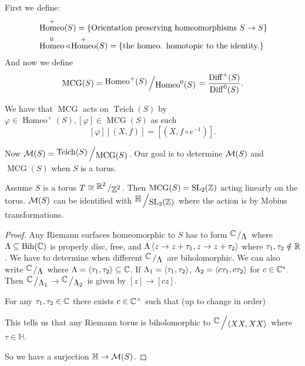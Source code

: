 \documentclass[11pt,a4paper]{article}
\DeclareMathOperator{\Bih}{Bih}
\renewcommand{\H}{\mathbb H}
\DeclareMathOperator{\Homeo}{Homeo}
\DeclareMathOperator{\Diff}{Diff}
\DeclareMathOperator{\MCG}{MCG}
\DeclareMathOperator{\Teich}{Teich}
\begin{document}
\begin{definition}
  First we define:
  \begin{align*}
    &\Homeo^+(S) = \set{\text{Orientation preserving homeomorphisms
    $S \to S$}} \\
    &\Homeo^0 \triangleleft \Homeo^+(S) = \set{
      \text{the homeo. homotopic to the identity.}}
  \end{align*}
  And now we define
  \[
    \MCG(S) = \bigslant{\Homeo^+(S)}{\Homeo^0(S)} =
    \frac{\Diff^+(S)}{\Diff^0(S)}.
  \]
\end{definition}

We have that $\MCG$ acts on $\Teich(S)$ by $\varphi \in \Homeo^+(S),
[\varphi] \in \MCG(S)$
as such
\[
  [\varphi] [(X,f)] = [(X,f \circ e^{-1})].
\]

Now $\M(S) = \bigslant{\Teich(S)}{\MCG(S)}$.
Our goal is to determine $\mathcal{M}(S)$ and $\MCG(S)$ when $S$ is a torus.

\begin{theorem}
  Assume $S$ is a torus $T \cong \bigslant{\R^2}{\Z^2}$.
  Then $\MCG(S) = \SL_2(\Z)$ acting linearly on the torus.
  $\mathcal{M}(S)$ can be identified with $\bigslant{\H}{\SL_2(\Z)}$ where the
  action is by Mobius transformations.
\end{theorem}
\begin{proof}
  Any Riemann surfaces homeomorphic to $S$ has to form 
  $\bigslant{\C}{\Lambda}$ where $\Lambda \subseteq \Bih(\C)$ is
properly disc, free, and $\Lambda \left\langle z \to z + \tau_1, z \to z + \tau_2 \right\rangle$
  where $\tau_1,\tau_2 \notin \mathbb{R}$.
  We have to determine when different $\bigslant{\C}{\Lambda}$ are
  biholomorphic.
  We can also write $\bigslant{\C}{\Lambda}$ where 
  $\Lambda = \left\langle \tau_1, \tau_2 \right\rangle \subseteq \mathbb{C}$.
  If $\Lambda_1 = \left\langle \tau_1, \tau_2 \right\rangle$, $\Lambda_2 = \left\langle c \tau_1, c \tau_2 \right\rangle$
  for $c \in \mathbb{C}^*$.
  Then $\bigslant{\C}{\Lambda_1} \to \bigslant{\C}{\Lambda_2}$
  is given by $[z] \to [cz]$.

  For any $\tau_1, \tau_2 \in \mathbb{C}$ there exists $c \in \mathbb{C}^{\times}$
  such that (up to change in order)


  This tells us that any Riemann torus is biholomorphic to 
  $\bigslant{\C}{\ip{XX}{XX}}$ where $\tau \in \H$.

  So we have a surjection $\H \to \M(S)$.
\end{proof}
\end{document}
